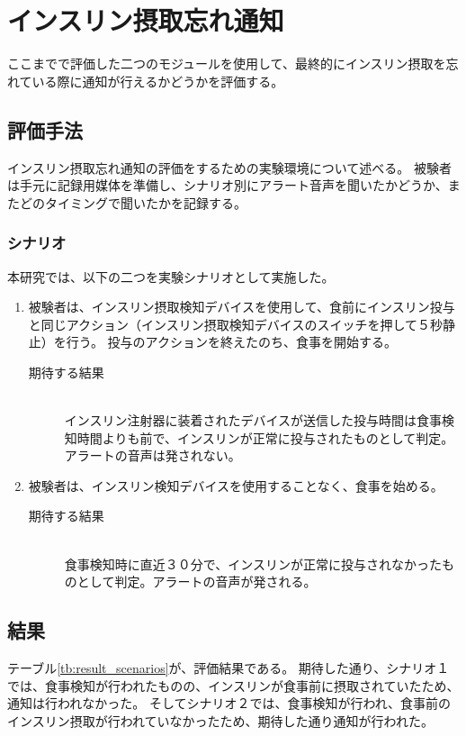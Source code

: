 \section{インスリン摂取忘れ通知}
ここまでで評価した二つのモジュールを使用して、最終的にインスリン摂取を忘れている際に通知が行えるかどうかを評価する。

\subsection{評価手法}
インスリン摂取忘れ通知の評価をするための実験環境について述べる。
被験者は手元に記録用媒体を準備し、シナリオ別にアラート音声を聞いたかどうか、またどのタイミングで聞いたかを記録する。

\subsubsection{シナリオ}

本研究では、以下の二つを実験シナリオとして実施した。

\begin{enumerate}
  \item 被験者は、インスリン摂取検知デバイスを使用して、食前にインスリン投与と同じアクション（インスリン摂取検知デバイスのスイッチを押して５秒静止）を行う。
  投与のアクションを終えたのち、食事を開始する。
  \begin{description}
    \item[期待する結果]\mbox{}\\
      インスリン注射器に装着されたデバイスが送信した投与時間は食事検知時間よりも前で、インスリンが正常に投与されたものとして判定。アラートの音声は発されない。
  \end{description}
  \item 被験者は、インスリン検知デバイスを使用することなく、食事を始める。
  \begin{description}
    \item[期待する結果]\mbox{}\\
      食事検知時に直近３０分で、インスリンが正常に投与されなかったものとして判定。アラートの音声が発される。
  \end{description}
\end{enumerate}

\subsection{結果}
テーブル\ref{tb:result_scenarios}が、評価結果である。
期待した通り、シナリオ１では、食事検知が行われたものの、インスリンが食事前に摂取されていたため、通知は行われなかった。
そしてシナリオ２では、食事検知が行われ、食事前のインスリン摂取が行われていなかったため、期待した通り通知が行われた。

